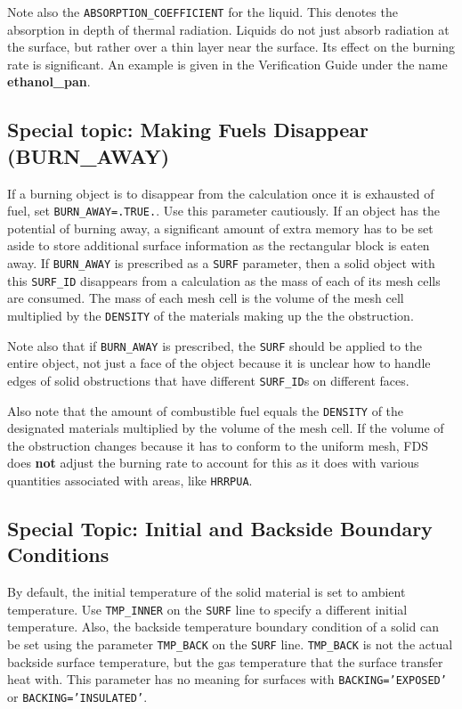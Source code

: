 \documentclass[11pt]{book}
\newcommand{\ct}{\tt\small}
\begin{document}
Note also the {\ct ABSORPTION\_COEFFICIENT} for the liquid. This
denotes the absorption in depth of thermal radiation. Liquids do not
just absorb radiation at the surface, but rather over a thin layer
near the surface. Its effect on the burning rate is significant. An
example is given in the Verification Guide under the name {\bf
ethanol\_pan}.


\subsection{Special topic: Making Fuels Disappear (BURN\_AWAY)}

If a burning object is to disappear from the
calculation once it is exhausted of fuel, set {\ct BURN\_AWAY=.TRUE.}.
Use this parameter cautiously. If an object has the potential of
burning away, a significant amount of extra memory has to be set aside
to store additional surface information as the rectangular block is
eaten away. If {\ct BURN\_AWAY} is prescribed as a {\ct SURF} parameter, then a solid
object with this {\ct SURF\_ID} disappears from a calculation as
the mass of each of its mesh cells are consumed. The mass of each mesh
cell is the volume of the mesh cell multiplied by the {\ct DENSITY} of the
materials making up the the obstruction.

\begin{warning}
\noindent
Note also that if {\ct BURN\_AWAY} is prescribed, the {\ct SURF} should be applied to the
entire object, not just a face of the object because it is unclear how to handle edges
of solid obstructions that have different {\ct SURF\_ID}s on different faces.
\end{warning}

\noindent
Also note that the amount of combustible fuel equals the {\ct DENSITY} of the designated materials
multiplied by the volume of the mesh cell. If the volume of the obstruction changes because it has
to conform to the uniform mesh, FDS does {\bf not} adjust the burning rate to account for this as
it does with various quantities associated with areas, like {\ct HRRPUA}.

\subsection{Special Topic: Initial and Backside Boundary Conditions}
By default, the initial temperature of the solid material is set to
ambient temperature. Use {\ct TMP\_INNER} on the {\ct SURF} line to
specify a different initial temperature.
Also, the backside temperature boundary condition of a solid can be
set using the parameter {\ct TMP\_BACK} on the {\ct SURF}
line. {\ct TMP\_BACK} is not the actual backside surface temperature,
but the gas temperature that the surface transfer heat with. This
parameter has no meaning for surfaces with {\ct BACKING='EXPOSED'} or
{\ct BACKING='INSULATED'}.
\end{document}

